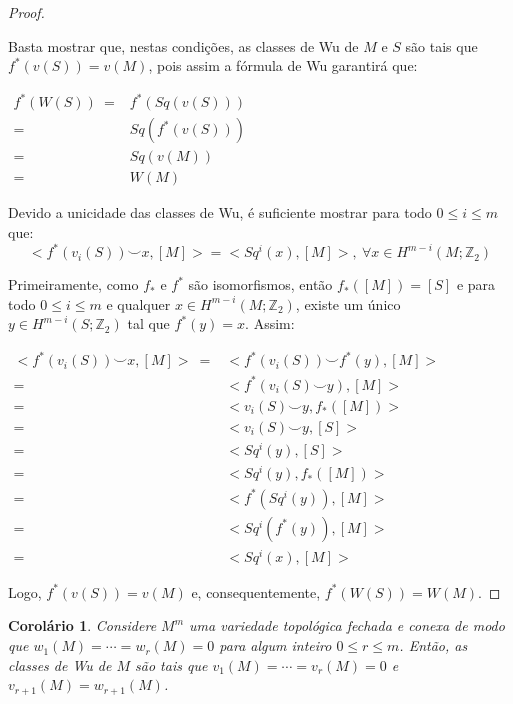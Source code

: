 \documentclass[12pt,oneside]{book} %
\newtheorem{cor}    {\hspace{0.5cm}Corol\'ario}[chapter]
\newcommand{\Z}{\mathbb{Z}}
\newcommand{\ccup}{\smile}
\begin{document}
\begin{proof}
	
	\
	
	\par Basta mostrar que, nestas condições, as classes de Wu de $M$ e $S$ são tais que $f^{*}(v(S))=v(M)$, pois assim a fórmula de Wu garantirá que: \newline
	
	$ \begin{array}{rl}
		f^{*}(W(S)) \ = & f^{*}(Sq(v(S))) \\
		= & Sq(f^{*}(v(S))) \\
		= & Sq(v(M)) \\
		= & W(M)
	\end{array} $ \newline
	
	\par Devido a unicidade das classes de Wu, é suficiente mostrar para todo $0\leq i\leq m$ que:
	$$ <f^{*}(v_{i}(S))\ccup x,[M]>=<Sq^{i}(x),[M]>, \ \forall x\in H^{m-i}(M;\Z_{2}) $$
	
	\par Primeiramente, como $f_{*}$ e $f^{*}$ são isomorfismos, então $f_{*}([M])=[S]$ e para todo $0\leq i\leq m$ e qualquer $x\in H^{m-i}(M;\Z_{2})$, existe um único $y\in H^{m-i}(S;\Z_{2})$ tal que $f^{*}(y)=x$. Assim: \newline
	
	$ \begin{array}{rl}
		<f^{*}(v_{i}(S))\ccup x,[M]> \ = & <f^{*}(v_{i}(S))\ccup f^{*}(y),[M]> \\
		= & <f^{*}(v_{i}(S)\ccup y),[M]> \\
		= & <v_{i}(S)\ccup y,f_{*}([M])> \\
		= & <v_{i}(S)\ccup y,[S]> \\
		= & <Sq^{i}(y),[S]> \\
		= & <Sq^{i}(y),f_{*}([M])> \\
		= & <f^{*}(Sq^{i}(y)),[M]> \\
		= & <Sq^{i}(f^{*}(y)),[M]> \\
		= & <Sq^{i}(x),[M]>
	\end{array} $ \newline
	
	\par Logo, $f^{*}(v(S))=v(M)$ e, consequentemente, $f^{*}(W(S))=W(M)$.
	
\end{proof}

\begin{cor}\label{ap_wu_2}
	Considere $M^{m}$ uma variedade topológica fechada e conexa de modo que $w_{1}(M)=\cdots=w_{r}(M)=0$ para algum inteiro $0\leq r\leq m$. Então, as classes de Wu de $M$ são tais que $v_{1}(M)=\cdots=v_{r}(M)=0$ e $v_{r+1}(M)=w_{r+1}(M)$.
\end{cor}
\end{document}
